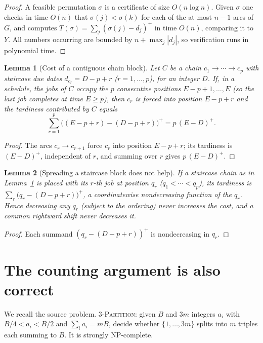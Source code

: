 \documentclass{amsart}
\newtheorem{lemma}{Lemma}
\theoremstyle{definition}
\theoremstyle{remark}
\begin{document}
\begin{proof}
A feasible permutation $\sigma$ is a certificate of size $O(n\log n)$. Given $\sigma$ one
checks in time $O(n)$ that $\sigma(j)<\sigma(k)$ for each of the at most $n-1$ arcs of
$G$, and computes $T(\sigma)=\sum_j(\sigma(j)-d_j)^{+}$ in time $O(n)$, comparing it to
$Y$. All numbers occurring are bounded by $n+\max_j|d_j|$, so verification runs in
polynomial time.
\end{proof}

\begin{lemma}[Cost of a contiguous chain block]\label{lem:block}
Let $C$ be a chain $c_1\to\cdots\to c_p$ with staircase due dates
$d_{c_r}=D-p+r$ ($r=1,\dots,p$), for an integer $D$. If, in a schedule, the jobs of $C$
occupy the $p$ consecutive positions $E-p+1,\dots,E$ (so the last job completes at time
$E\ge p$), then $c_r$ is forced into position $E-p+r$ and the tardiness contributed by
$C$ equals
\[
   \sum_{r=1}^{p}\bigl((E-p+r)-(D-p+r)\bigr)^{+}=p\,(E-D)^{+}.
\]
\end{lemma}

\begin{proof}
The arcs $c_r\to c_{r+1}$ force $c_r$ into position $E-p+r$; its tardiness is
$(E-D)^{+}$, independent of $r$, and summing over $r$ gives $p\,(E-D)^{+}$.
\end{proof}

\begin{lemma}[Spreading a staircase block does not help]\label{lem:spread}
If a staircase chain as in Lemma~\ref{lem:block} is placed with its $r$-th job at
position $q_r$ ($q_1<\cdots<q_p$), its tardiness is
$\sum_{r}\bigl(q_r-(D-p+r)\bigr)^{+}$, a coordinatewise nondecreasing function of the
$q_r$. Hence decreasing any $q_r$ (subject to the ordering) never increases the cost, and
a common rightward shift never decreases it.
\end{lemma}

\begin{proof}
Each summand $(q_r-(D-p+r))^{+}$ is nondecreasing in $q_r$.
\end{proof}

\section{The counting argument is also correct}\label{sec:count}

We recall the source problem. \textsc{3-Partition}: given $B$ and $3m$ integers $a_i$
with $B/4<a_i<B/2$ and $\sum_i a_i=mB$, decide whether $\{1,\dots,3m\}$ splits into $m$
triples each summing to $B$. It is strongly NP-complete.
\end{document}
